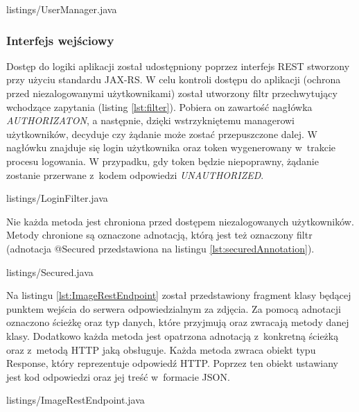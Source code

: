 
{listings/UserManager.java}

\subsubsection{Interfejs wejściowy}
Dostęp do logiki aplikacji został udostępniony poprzez interfejs REST stworzony
przy użyciu standardu JAX-RS. W celu kontroli dostępu do aplikacji
(ochrona przed niezalogowanymi użytkownikami) został utworzony filtr przechwytujący wchodzące zapytania (listing \ref{lst:filter}). 
Pobiera on zawartość nagłówka \textit{AUTHORIZATON}, a następnie, dzięki wstrzykniętemu managerowi użytkowników, decyduje czy żądanie może zostać przepuszczone dalej. W nagłówku znajduje się login użytkownika oraz token wygenerowany w~trakcie procesu logowania. W przypadku, gdy token będzie niepoprawny, żądanie zostanie przerwane z~kodem odpowiedzi \textit{UNAUTHORIZED}.


{listings/LoginFilter.java}

Nie każda metoda jest chroniona przed dostępem niezalogowanych użytkowników. Metody chronione są oznaczone adnotacją, którą jest też oznaczony filtr (adnotacja @Secured przedstawiona na listingu \ref{lst:securedAnnotation}).


{listings/Secured.java}

Na listingu \ref{lst:ImageRestEndpoint} został przedstawiony fragment klasy będącej punktem wejścia do serwera odpowiedzialnym za zdjęcia. Za pomocą adnotacji oznaczono ścieżkę oraz typ danych, które przyjmują oraz zwracają metody danej klasy. Dodatkowo każda metoda jest opatrzona adnotacją z~konkretną ścieżką oraz z~metodą HTTP jaką obsługuje. Każda metoda zwraca obiekt typu Response, który reprezentuje odpowiedź HTTP. Poprzez ten obiekt ustawiany jest kod odpowiedzi oraz jej treść w~formacie JSON.


{listings/ImageRestEndpoint.java}

